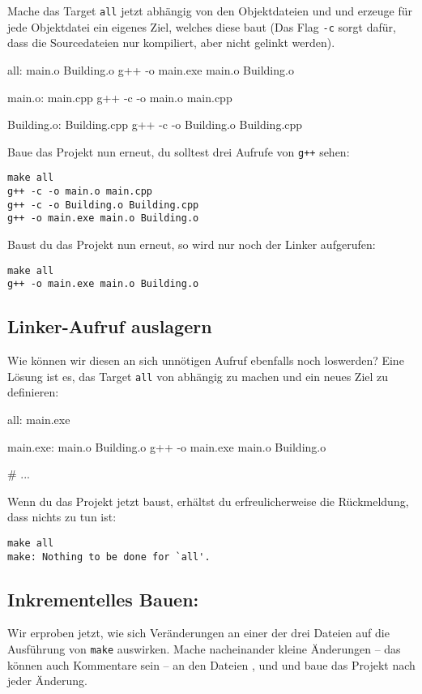 Mache das Target \texttt{all} jetzt abhängig von den Objektdateien  und  und erzeuge für jede Objektdatei ein eigenes Ziel, welches diese baut (Das Flag \texttt{-c} sorgt dafür, dass die Sourcedateien nur kompiliert, aber nicht gelinkt werden).
\begin{lstmake}
all: main.o Building.o
    g++ -o main.exe main.o Building.o

main.o: main.cpp
    g++ -c -o main.o main.cpp

Building.o: Building.cpp
    g++ -c -o Building.o Building.cpp
\end{lstmake}

Baue das Projekt nun erneut, du solltest drei Aufrufe von \texttt{g++} sehen:
\begin{verbatim}
make all
g++ -c -o main.o main.cpp
g++ -c -o Building.o Building.cpp
g++ -o main.exe main.o Building.o
\end{verbatim}
Baust du das Projekt nun erneut, so wird nur noch der Linker aufgerufen:
\begin{verbatim}
make all
g++ -o main.exe main.o Building.o
\end{verbatim}

\subsection{Linker-Aufruf auslagern}
Wie können wir diesen an sich unnötigen Aufruf ebenfalls noch loswerden?
Eine Lösung ist es, das Target \texttt{all} von  abhängig zu machen und ein neues Ziel  zu definieren:
\begin{lstmake}
all: main.exe

main.exe: main.o Building.o
    g++ -o main.exe main.o Building.o

# ...
\end{lstmake}

Wenn du das Projekt jetzt baust, erhältst du erfreulicherweise die Rückmeldung, dass nichts zu tun ist:
\begin{verbatim}
make all
make: Nothing to be done for `all'.
\end{verbatim}

\subsection{Inkrementelles Bauen:}
Wir erproben jetzt, wie sich Veränderungen an einer der drei Dateien auf die Ausführung von \texttt{make} auswirken.
Mache nacheinander kleine Änderungen -- das können auch Kommentare sein -- an den Dateien ,  und  und baue das Projekt nach jeder Änderung.

